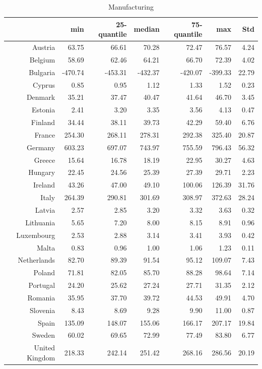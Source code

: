 \documentclass[a4paper,twoside,10pt]{article}
\begin{document}
\begin{table}[H]
	\centering
	\begin{tabular}{|r|rrrrr|r|}
  \hline
& min & 25-quantile & median & 75-quantile & max & Std \\ 
\hline
Austria & 63.75 & 66.61 & 70.28 & 72.47 & 76.57 & 4.24 \\ 
Belgium & 58.69 & 62.46 & 64.21 & 66.70 & 72.39 & 4.02 \\ 
Bulgaria & -470.74 & -453.31 & -432.37 & -420.07 & -399.33 & 22.79 \\ 
Cyprus & 0.85 & 0.95 & 1.12 & 1.33 & 1.52 & 0.23 \\ 
Denmark & 35.21 & 37.47 & 40.47 & 41.64 & 46.70 & 3.45 \\ \hline
Estonia & 2.41 & 3.20 & 3.35 & 3.56 & 4.13 & 0.47 \\ 
Finland & 34.44 & 38.11 & 39.73 & 42.29 & 59.40 & 6.76 \\ 
France & 254.30 & 268.11 & 278.31 & 292.38 & 325.40 & 20.87 \\ 
Germany & 603.23 & 697.07 & 743.97 & 755.59 & 796.43 & 56.32 \\ 
Greece & 15.64 & 16.78 & 18.19 & 22.95 & 30.27 & 4.63 \\ \hline
Hungary & 22.45 & 24.56 & 25.39 & 27.39 & 29.71 & 2.23 \\ 
Ireland & 43.26 & 47.00 & 49.10 & 100.06 & 126.39 & 31.76 \\ 
Italy & 264.39 & 290.81 & 301.69 & 308.97 & 372.63 & 28.24 \\ 
Latvia & 2.57 & 2.85 & 3.20 & 3.32 & 3.63 & 0.32 \\ 
Lithuania & 5.65 & 7.20 & 8.00 & 8.15 & 8.91 & 0.96 \\ \hline
Luxembourg & 2.53 & 2.88 & 3.14 & 3.41 & 3.93 & 0.42 \\ 
Malta & 0.83 & 0.96 & 1.00 & 1.06 & 1.23 & 0.11 \\ 
Netherlands & 82.70 & 89.39 & 91.54 & 95.12 & 109.07 & 7.43 \\ 
Poland & 71.81 & 82.05 & 85.70 & 88.28 & 98.64 & 7.14 \\ 
Portugal & 24.20 & 25.62 & 27.24 & 27.71 & 31.35 & 2.12 \\ \hline
Romania & 35.95 & 37.70 & 39.72 & 44.53 & 49.91 & 4.70 \\ 
Slovenia & 8.43 & 8.69 & 9.28 & 9.90 & 11.00 & 0.87 \\ 
Spain & 135.09 & 148.07 & 155.06 & 166.17 & 207.17 & 19.84 \\ 
Sweden & 60.02 & 69.65 & 72.99 & 77.49 & 83.80 & 6.77 \\ 
United Kingdom & 218.33 & 242.14 & 251.42 & 268.16 & 286.56 & 20.19 \\ 
\hline
	\end{tabular}
	\caption{Manufacturing}
	\label{Manufacturing}
\end{table}
\end{document}
